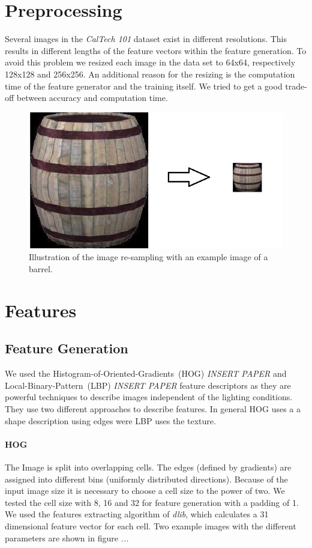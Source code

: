 \documentclass[a4paper,10pt]{article}
\begin{document}
\section{Preprocessing}
\label{sec:preprocessing}
Several images in the \emph{CalTech 101} dataset exist in different resolutions. 
This results in different lengths of the feature vectors within the feature generation.
To avoid this problem we resized each image in the data set to 64x64, respectively 128x128 and 256x256.
An additional reason for the resizing is the computation time of the feature generator and the training itself. 
We tried to get a good trade-off between accuracy and computation time.
\begin{figure}[ht]
\centering
\includegraphics[scale=0.5]{images/preprocessing.png}
\caption{Illustration of the image re-sampling with an example image of a barrel.}
\label{fig:resize}
\end{figure}

\section{Features}
\subsection{Feature Generation}

We used the Histogram-of-Oriented-Gradients~(HOG) \emph{INSERT PAPER} and Local-Binary-Pattern~(LBP) \emph{INSERT PAPER} feature descriptors as they are powerful techniques to describe images independent of the lighting conditions. They use two different approaches to describe features. In general HOG uses a a shape description using edges were LBP uses the texture.

\paragraph{HOG} 
The Image is split into overlapping cells. The edges (defined by gradients) are assigned into different bins (uniformly distributed directions).
Because of the input image size it is necessary to choose a cell size to the power of two. 
We tested the cell size with 8, 16 and 32 for feature generation with a padding of 1.
We used the features extracting algorithm of \emph{dlib}, which calculates a 31 dimensional feature vector for each cell.
Two example images with the different parameters are shown in figure \emph{...}
\end{document}
